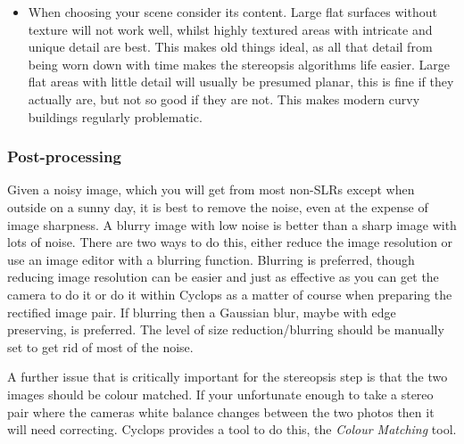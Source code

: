 \documentclass[10pt,a4paper,twoside]{article}
\begin{document}
\begin{itemize}
\item When choosing your scene consider its content. Large flat surfaces without texture will not work well, whilst highly textured areas with intricate and unique detail are best. This makes old things ideal, as all that detail from being worn down with time makes the stereopsis algorithms life easier. Large flat areas with little detail will usually be presumed planar, this is fine if they actually are, but not so good if they are not. This makes modern curvy buildings regularly problematic.
\end{itemize}

\subsubsection{Post-processing}
Given a noisy image, which you will get from most non-SLRs except when outside on a sunny day, it is best to remove the noise, even at the expense of image sharpness.
A blurry image with low noise is better than a sharp image with lots of noise.
There are two ways to do this, either reduce the image resolution or use an image editor with a blurring function.
Blurring is preferred, though reducing image resolution can be easier and just as effective as you can get the camera to do it or do it within Cyclops as a matter of course when preparing the rectified image pair.
If blurring then a Gaussian blur, maybe with edge preserving, is preferred.
The level of size reduction/blurring should be manually set to get rid of most of the noise.

A further issue that is critically important for the stereopsis step is that the two images should be colour matched. If your unfortunate enough to take a stereo pair where the cameras white balance changes between the two photos then it will need correcting. Cyclops provides a tool to do this, the \emph{Colour Matching} tool.
\end{document}
